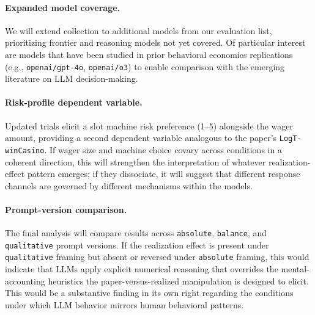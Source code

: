 \documentclass[midterm]{sparreport}
\begin{document}
\paragraph{Expanded model coverage.}
We will extend collection to additional models from our evaluation list, prioritizing
frontier and reasoning models not yet covered. Of particular interest are models
that have been studied in prior behavioral economics replications
(e.g., \texttt{openai/gpt-4o}, \texttt{openai/o3}) to enable comparison with
the emerging literature on LLM decision-making.

\paragraph{Risk-profile dependent variable.}
Updated trials elicit a slot machine risk preference (1--5) alongside the wager
amount, providing a second dependent variable analogous to the paper's
\texttt{LogT-winCasino}. If wager size and machine choice covary across conditions
in a coherent direction, this will strengthen the interpretation of whatever
realization-effect pattern emerges; if they dissociate, it will suggest that
different response channels are governed by different mechanisms within the models.

\paragraph{Prompt-version comparison.}
The final analysis will compare results across \texttt{absolute},
\texttt{balance}, and \texttt{qualitative} prompt versions. If the realization
effect is present under \texttt{qualitative} framing but absent or reversed under
\texttt{absolute} framing, this would indicate that LLMs apply explicit numerical
reasoning that overrides the mental-accounting heuristics the paper-versus-realized
manipulation is designed to elicit. This would be a substantive finding in its own
right regarding the conditions under which LLM behavior mirrors human behavioral
patterns.



\end{document}
